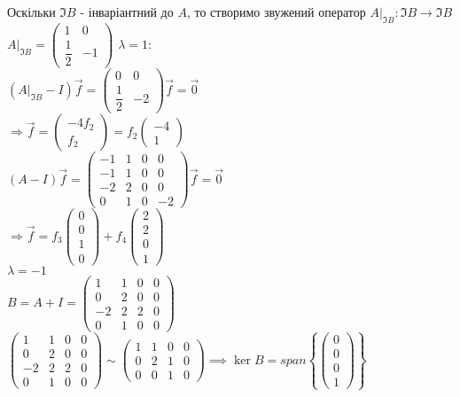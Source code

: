\documentclass[a4paper, 10pt]{article}
\theoremstyle{theoremdd}
\begin{document}
Оскільки $\Im B$ - інваріантний до $A$, то створимо звужений оператор $A|_{\Im B}: \Im B \to \Im B$\\
$A|_{\Im B} = \begin{pmatrix}
1 & 0 \\
\dfrac{1}{2} & -1
\end{pmatrix}$
$\lambda = 1:$\\
$(A|_{\Im B} - I)\vec{f} = \begin{pmatrix}
0 & 0 \\
\dfrac{1}{2} & -2
\end{pmatrix} \vec{f} = \vec{0}$\\
$\Rightarrow \vec{f} = \begin{pmatrix}
-4f_2 \\ f_2
\end{pmatrix} = f_2 \begin{pmatrix}
-4 \\ 1
\end{pmatrix}$\\
$(A-I)\vec{f} = \begin{pmatrix}
-1 & 1 & 0 & 0 \\
-1 & 1 & 0 & 0 \\
-2 & 2 & 0 & 0 \\
0 & 1 & 0 & -2
\end{pmatrix} \vec{f} = \vec{0}$\\
$\Rightarrow \vec{f} = f_3 \begin{pmatrix}
0 \\ 0 \\ 1 \\ 0
\end{pmatrix} + f_4 \begin{pmatrix}
2 \\ 2 \\ 0 \\ 1
\end{pmatrix}$
\bigskip \\
$\lambda = -1$\\
$B = A+I = \begin{pmatrix}
1 & 1 & 0 & 0 \\
0 & 2 & 0 & 0 \\
-2 & 2 & 2 & 0 \\
0 & 1 & 0 & 0
\end{pmatrix}$\\
$\begin{pmatrix}
1 & 1 & 0 & 0 \\
0 & 2 & 0 & 0 \\
-2 & 2 & 2 & 0 \\
0 & 1 & 0 & 0
\end{pmatrix} \sim \begin{pmatrix}
1 & 1 & 0 & 0 \\
0 & 2 & 1 & 0 \\
0 & 0 & 1 & 0
\end{pmatrix} \implies \ker B = span \left\{ \begin{pmatrix}
0 \\ 0 \\ 0 \\ 1
\end{pmatrix} \right\}$
\end{document}
